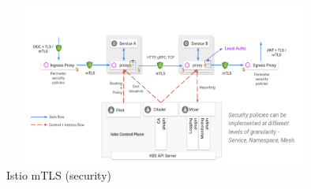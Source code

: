 \documentclass[default]{beamer}
\begin{document}
\begin{frame}
  \begin{figure}
    \includegraphics[width=300pt,height=150pt]{src/kubecon/static/istio.png}
    \caption{Istio mTLS (security)}
  \end{figure}
\end{frame}
\end{document}
